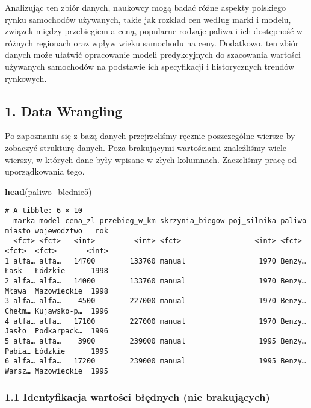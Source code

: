\documentclass[
]{article}
\newenvironment{Shaded}{\begin{snugshade}}{\end{snugshade}}
\newcommand{\FunctionTok}[1]{\textcolor[rgb]{0.13,0.29,0.53}{\textbf{#1}}}
\newcommand{\NormalTok}[1]{#1}
\begin{document}
Analizując ten zbiór danych, naukowcy mogą badać różne aspekty polskiego
rynku samochodów używanych, takie jak rozkład cen według marki i modelu,
związek między przebiegiem a ceną, popularne rodzaje paliwa i ich
dostępność w różnych regionach oraz wpływ wieku samochodu na ceny.
Dodatkowo, ten zbiór danych może ułatwić opracowanie modeli
predykcyjnych do szacowania wartości używanych samochodów na podstawie
ich specyfikacji i historycznych trendów rynkowych.

\subsection{1. Data Wrangling}\label{data-wrangling}

Po zapoznaniu się z bazą danych przejrzeliśmy ręcznie poszczególne
wiersze by zobaczyć strukturę danych. Poza brakującymi wartościami
znaleźliśmy wiele wierszy, w których dane były wpisane w złych
kolumnach. Zaczeliśmy pracę od uporządkowania tego.

\begin{Shaded}
\begin{Highlighting}[]
\FunctionTok{head}\NormalTok{(paliwo\_blednie5)}
\end{Highlighting}
\end{Shaded}

\begin{verbatim}
# A tibble: 6 × 10
  marka model cena_zl przebieg_w_km skrzynia_biegow poj_silnika paliwo miasto wojewodztwo   rok
  <fct> <fct>   <int>         <int> <fct>                 <int> <fct>  <fct>  <fct>       <int>
1 alfa… alfa…   14700        133760 manual                 1970 Benzy… Łask   Łódzkie      1998
2 alfa… alfa…   14000        133760 manual                 1970 Benzy… Mława  Mazowieckie  1998
3 alfa… alfa…    4500        227000 manual                 1970 Benzy… Chełm… Kujawsko-p…  1996
4 alfa… alfa…   17100        227000 manual                 1970 Benzy… Jasło  Podkarpack…  1996
5 alfa… alfa…    3900        239000 manual                 1995 Benzy… Pabia… Łódzkie      1995
6 alfa… alfa…   17200        239000 manual                 1995 Benzy… Warsz… Mazowieckie  1995
\end{verbatim}

\subsubsection{1.1 Identyfikacja wartości błędnych (nie
brakujących)}\label{identyfikacja-wartoux15bci-bux142ux119dnych-nie-brakujux105cych}
\end{document}
